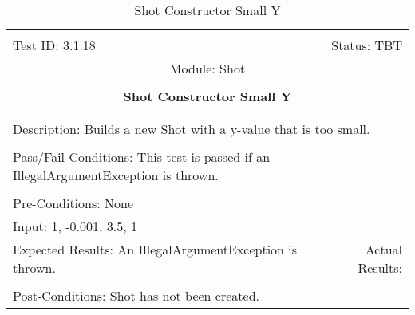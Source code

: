\documentclass[titlepage]{article}
\begin{document}
\begin{center}%
\begin{table}
\begin{tabular}{|l r|}\hline&\\[-2mm]
	Test ID: 3.1.18	&Status: TBT\\[-3mm]
	\multicolumn{2}{|c|}{Module: Shot}\\&\\
	\multicolumn{2}{|c|}{\textbf{\large{Shot Constructor Small Y}}}\\&\\\hline&\\[-3mm]
	\multicolumn{2}{|p{\textwidth}|}{Description: Builds a new Shot with a y-value that is too small.}\\[1mm]\hline&\\[-3mm]
	\multicolumn{2}{|p{\textwidth}|}{Pass/Fail Conditions: This test is passed if an IllegalArgumentException is thrown.}\\[1mm]\hline&\\[-3mm]
	\multicolumn{2}{|p{\textwidth}|}{Pre-Conditions: None}\\[4mm]
	\multicolumn{2}{|p{\textwidth}|}{Input: 1, -0.001, 3.5, 1}\\[2mm]\hline
	\multicolumn{1}{|p{0.49\textwidth}}{Expected Results: An IllegalArgumentException is thrown.}	&\multicolumn{1}{|p{0.45\textwidth}|}{Actual Results: }\\\hline&\\[-3mm]
	\multicolumn{2}{|p{\textwidth}|}{Post-Conditions: Shot has not been created.}\\\hline
\end{tabular}
\caption{Shot Constructor Small Y}
\end{table}
\end{center}
\end{document}
